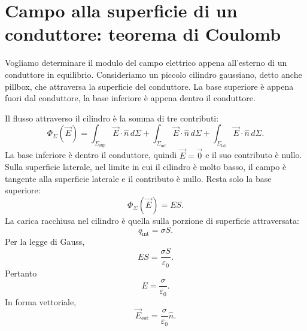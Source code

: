 \documentclass[a4paper]{article}
\begin{document}
\begin{center}
\end{center}

\section{Campo alla superficie di un conduttore: teorema di Coulomb}

Vogliamo determinare il modulo del campo elettrico appena all'esterno di un conduttore in equilibrio. Consideriamo un piccolo cilindro gaussiano, detto anche pillbox, che attraversa la superficie del conduttore. La base superiore è appena fuori dal conduttore, la base inferiore è appena dentro il conduttore.

\begin{center}
\end{center}

Il flusso attraverso il cilindro è la somma di tre contributi:
\[
    \Phi_\Sigma(\vec{E})=
    \int_{\Sigma_{\mathrm{sup}}}\vec{E}\cdot\hat{n}\,d\Sigma+
    \int_{\Sigma_{\mathrm{inf}}}\vec{E}\cdot\hat{n}\,d\Sigma+
    \int_{\Sigma_{\mathrm{lat}}}\vec{E}\cdot\hat{n}\,d\Sigma.
\]
La base inferiore è dentro il conduttore, quindi \(\vec{E}=\vec{0}\) e il suo contributo è nullo. Sulla superficie laterale, nel limite in cui il cilindro è molto basso, il campo è tangente alla superficie laterale e il contributo è nullo. Resta solo la base superiore:
\[
    \Phi_\Sigma(\vec{E})=ES.
\]
La carica racchiusa nel cilindro è quella sulla porzione di superficie attraversata:
\[
    q_{\mathrm{int}}=\sigma S.
\]
Per la legge di Gauss,
\[
    ES=\frac{\sigma S}{\varepsilon_0}.
\]
Pertanto
\[
    E=\frac{\sigma}{\varepsilon_0}.
\]
In forma vettoriale,
\[
    \vec{E}_{\mathrm{est}}=\frac{\sigma}{\varepsilon_0}\hat{n}.
\]
\end{document}
